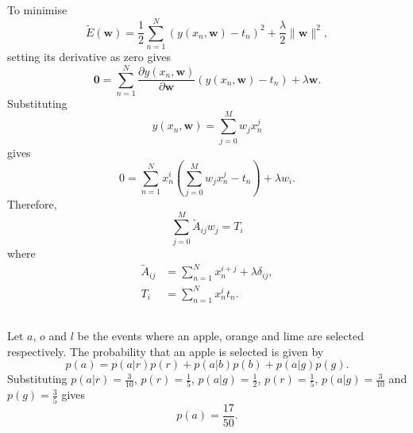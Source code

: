 \subsection{}
To minimise 
%
\begin{equation}
\tilde{E}(\mathbf{w}) = \frac{1}{2} \sum_{n = 1}^{N} \left( y(x_n, \mathbf{w}) - t_n \right) ^ 2 + \frac{\lambda}{2} \lVert \mathbf{w} \rVert ^ 2,
\end{equation}
%
setting its derivative as zero gives
%
\begin{equation}
\mathbf{0} = \sum_{n = 1}^{N} \frac{\partial y(x_n, \mathbf{w})}{\partial \mathbf{w}} \left( y(x_n, \mathbf{w}) - t_n \right) + \lambda \mathbf{w}.
\end{equation}
%
Substituting 
%
\begin{equation}
y(x_n, \mathbf{w}) = \sum_{j = 0}^{M} w_j x_n^j
\end{equation}
%
gives
%
\begin{equation}
0 = \sum_{n = 1}^{N} x_n^i \left( \sum_{j = 0}^{M} w_j x_n^j - t_n \right) + \lambda w_i.
\end{equation}
%
Therefore,
%
\begin{equation}
\sum_{j = 0}^{M} \tilde{A}_{ij} w_j = T_i
\end{equation}
%
where
%
\begin{equation}
\begin{aligned}
\tilde{A}_{ij} &= \sum_{n = 1}^{N} x_n^{i + j} + \lambda \delta_{ij}, \\
T_i &= \sum_{n = 1}^{N} x_n^i t_n.
\end{aligned}
\end{equation}


\subsection{}
Let $a$, $o$ and $l$ be the events where an apple, orange and lime are selected respectively.
The probability that an apple is selected is given by
%
\begin{equation}
p(a) = p(a | r) p(r) + p(a | b) p(b) + p(a | g) p(g).
\end{equation}
%
Substituting $p(a | r) = \frac{3}{10}$, $p(r) = \frac{1}{5}$, $p(a | g) = \frac{1}{2}$, $p(r) = \frac{1}{5}$, $p(a | g) = \frac{3}{10}$ and $p(g) = \frac{3}{5}$ gives
%
\begin{equation}
p(a) = \frac{17}{50}.
\end{equation}
%

